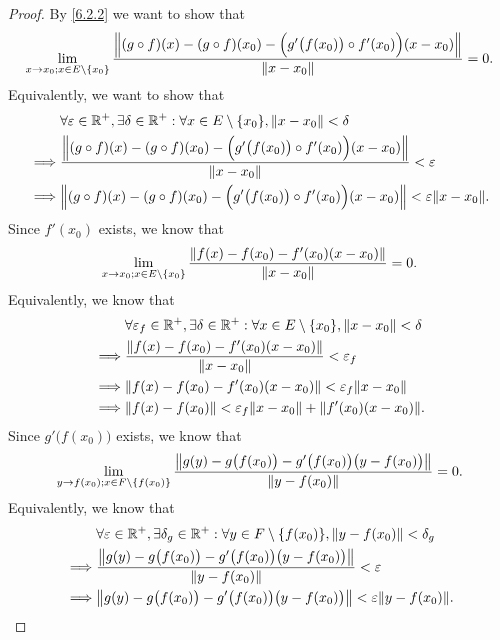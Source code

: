 \begin{proof}
  By \cref{6.2.2} we want to show that
  \[
    \lim_{x \to x_0 ; x \in E \setminus \{x_0\}} \dfrac{\norm*{(g \circ f)(x) - (g \circ f)(x_0) - \Big(g'\big(f(x_0)\big) \circ f'(x_0)\Big)(x - x_0)}}{\norm*{x - x_0}} = 0.
  \]
  Equivalently, we want to show that
  \begin{align*}
             & \forall \varepsilon \in \R^+, \exists \delta \in \R^+ : \forall x \in E \setminus \{x_0\}, \norm*{x - x_0} < \delta                    \\
    \implies & \dfrac{\norm*{(g \circ f)(x) - (g \circ f)(x_0) - \Big(g'\big(f(x_0)\big) \circ f'(x_0)\Big)(x - x_0)}}{\norm*{x - x_0}} < \varepsilon \\
    \implies & \norm*{(g \circ f)(x) - (g \circ f)(x_0) - \Big(g'\big(f(x_0)\big) \circ f'(x_0)\Big)(x - x_0)} < \varepsilon \norm*{x - x_0}.
  \end{align*}
  Since \(f'(x_0)\) exists, we know that
  \[
    \lim_{x \to x_0 ; x \in E \setminus \{x_0\}} \dfrac{\norm*{f(x) - f(x_0) - f'(x_0)(x - x_0)}}{\norm*{x - x_0}} = 0.
  \]
  Equivalently, we know that
  \begin{align*}
             & \forall \varepsilon_f \in \R^+, \exists \delta \in \R^+ : \forall x \in E \setminus \{x_0\}, \norm*{x - x_0} < \delta \\
    \implies & \dfrac{\norm*{f(x) - f(x_0) - f'(x_0)(x - x_0)}}{\norm*{x - x_0}} < \varepsilon_f                                     \\
    \implies & \norm*{f(x) - f(x_0) - f'(x_0)(x - x_0)} < \varepsilon_f \norm*{x - x_0}                                              \\
    \implies & \norm*{f(x) - f(x_0)} < \varepsilon_f \norm*{x - x_0} + \norm*{f'(x_0)(x - x_0)}.
  \end{align*}
  Since \(g'\big(f(x_0)\big)\) exists, we know that
  \[
    \lim_{y \to f(x_0) ; x \in F \setminus \{f(x_0)\}} \dfrac{\norm*{g(y) - g\big(f(x_0)\big) - g'\big(f(x_0)\big)\big(y - f(x_0)\big)}}{\norm*{y - f(x_0)}} = 0.
  \]
  Equivalently, we know that
  \begin{align*}
             & \forall \varepsilon \in \R^+, \exists \delta_g \in \R^+ : \forall y \in F \setminus \{f(x_0)\}, \norm*{y - f(x_0)} < \delta_g \\
    \implies & \dfrac{\norm*{g(y) - g\big(f(x_0)\big) - g'\big(f(x_0)\big)\big(y - f(x_0)\big)}}{\norm*{y - f(x_0)}} < \varepsilon           \\
    \implies & \norm*{g(y) - g\big(f(x_0)\big) - g'\big(f(x_0)\big)\big(y - f(x_0)\big)} < \varepsilon \norm*{y - f(x_0)}.

\end{align*}
\end{proof}

